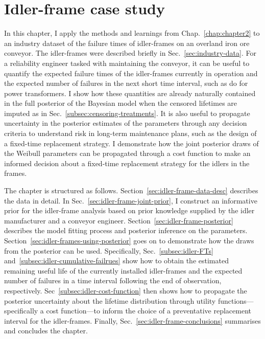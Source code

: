 \chapter{Idler-frame case study}\label{chap:chapter3}

In this chapter, I apply the methods and learnings from Chap.~\ref{chap:chapter2} to an industry dataset of the failure times of idler-frames on an overland iron ore conveyor. The idler-frames were described briefly in Sec.~\ref{sec:industry-data}. For a reliability engineer tasked with maintaining the conveyor, it can be useful to quantify the expected failure times of the idler-frames currently in operation and the expected number of failures in the next short time interval, such as \citet{hong2009} do for power transformers. I show how these quantities are already naturally contained in the full posterior of the Bayesian model when the censored lifetimes are imputed as in Sec.~\ref{subsec:censoring-treatments}. It is also useful to propagate uncertainty in the posterior estimates of the parameters through any decision criteria to understand risk in long-term maintenance plans, such as the design of a fixed-time replacement strategy. I demonstrate how the joint posterior draws of the Weibull parameters can be propagated through a cost function to make an informed decision about a fixed-time replacement strategy for the idlers in the frames.

The chapter is structured as follows. Section~\ref{sec:idler-frame-data-desc} describes the data in detail. In Sec.~\ref{sec:idler-frame-joint-prior}, I construct an informative prior for the idler-frame analysis based on prior knowledge supplied by the idler manufacturer and a conveyor engineer. Section~\ref{sec:idler-frame-posterior} describes the model fitting process and posterior inference on the parameters. Section~\ref{sec:idler-frames-using-posterior} goes on to demonstrate how the draws from the posterior can be used. Specifically, Sec.~\ref{subsec:idler-FTs} and~\ref{subsec:idler-cumulative-failrues} show how to obtain the estimated remaining useful life of the currently installed idler-frames and the expected number of failures in a time interval following the end of observation, respectively. Sec~\ref{subsec:idler-cost-function} then shows how to propagate the posterior uncertainty about the lifetime distribution through utility functions---specifically a cost function---to inform the choice of a preventative replacement interval for the idler-frames. Finally, Sec.~\ref{sec:idler-frame-conclusions} summarises and concludes the chapter.

